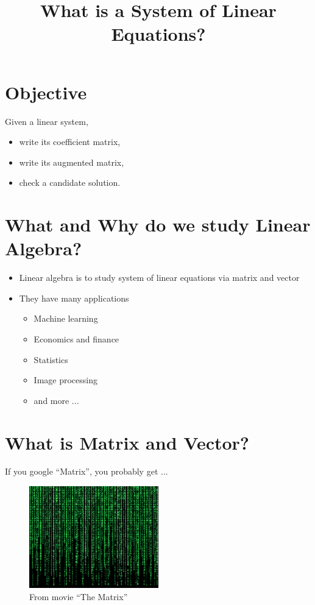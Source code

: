 \documentclass{beamer}
\title %
{What is a System of Linear Equations?}
\author{}
\institute{WPI} %
\theoremstyle{definition}
\theoremstyle{theorem}
\begin{document}
\begin{frame}
  \titlepage
\end{frame}

\section{Objective}
\begin{frame}
 Given a linear system, 
\begin{itemize}
 \item write its coefficient matrix, 
 \item write its augmented matrix,
 \item check a candidate solution.
\end{itemize}
\end{frame}

\section{What and Why do we study Linear Algebra? }

\begin{frame}

\begin{itemize}
 \item Linear algebra is to study system of linear equations via matrix and vector
 \item They have many applications

\begin{itemize}
 \item  Machine learning
 \item Economics and finance 
 \item Statistics
 \item Image processing
 \item and more ...
\end{itemize}

\end{itemize}

\end{frame}



\section{What is Matrix and Vector?}

\begin{frame}
 {If you google ``Matrix'', you probably get ...}
 \begin{figure}
  \includegraphics[width= 0.5\textwidth]{matrix.jpg}
  \caption{From movie ``The Matrix''}
  \label{fig:matrix}
\end{figure}
\end{frame}
\end{document}
